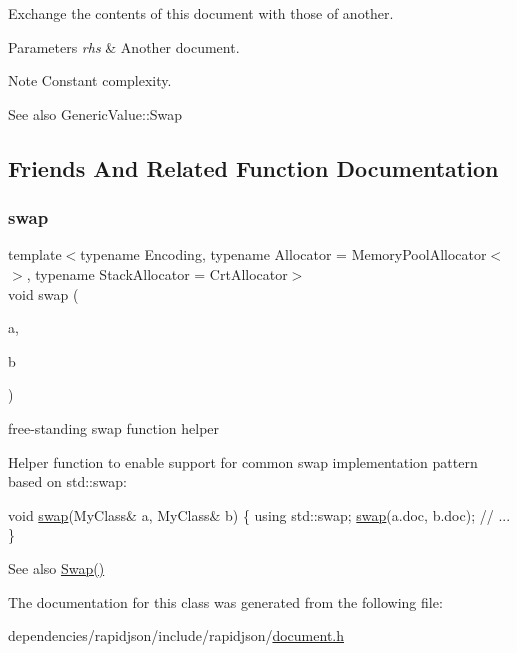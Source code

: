 Exchange the contents of this document with those of another. 


\begin{DoxyParams}{Parameters}
{\em rhs} & Another document. \\
\hline
\end{DoxyParams}
\begin{DoxyNote}{Note}
Constant complexity. 
\end{DoxyNote}
\begin{DoxySeeAlso}{See also}
Generic\+Value\+::\+Swap 
\end{DoxySeeAlso}


\subsection{Friends And Related Function Documentation}
\mbox{\label{class_generic_document_a0d63efcc43758ac3aed77e868233369d}} 
\subsubsection{\texorpdfstring{swap}{swap}}
{\footnotesize\ttfamily template$<$typename Encoding, typename Allocator = Memory\+Pool\+Allocator$<$$>$, typename Stack\+Allocator = Crt\+Allocator$>$ \\
void swap (\begin{DoxyParamCaption}\item[{\hyperlink{class_generic_document}{Generic\+Document}$<$ Encoding, Allocator, Stack\+Allocator $>$ \&}]{a,  }\item[{\hyperlink{class_generic_document}{Generic\+Document}$<$ Encoding, Allocator, Stack\+Allocator $>$ \&}]{b }\end{DoxyParamCaption})\hspace{0.3cm}{\ttfamily [friend]}}



free-\/standing swap function helper 

Helper function to enable support for common swap implementation pattern based on {\ttfamily std\+::swap\+:} 
\begin{DoxyCode}
\textcolor{keywordtype}{void} \hyperlink{class_generic_document_a0d63efcc43758ac3aed77e868233369d}{swap}(MyClass& a, MyClass& b) \{
    \textcolor{keyword}{using} std::swap;
    \hyperlink{class_generic_document_a0d63efcc43758ac3aed77e868233369d}{swap}(a.doc, b.doc);
    \textcolor{comment}{// ...}
\}
\end{DoxyCode}
 \begin{DoxySeeAlso}{See also}
\hyperlink{class_generic_document_a6290e1290fad74177625af5938c0c58f}{Swap()} 
\end{DoxySeeAlso}


The documentation for this class was generated from the following file\+:\begin{DoxyCompactItemize}
\item 
dependencies/rapidjson/include/rapidjson/\hyperlink{document_8h}{document.\+h}\end{DoxyCompactItemize}
